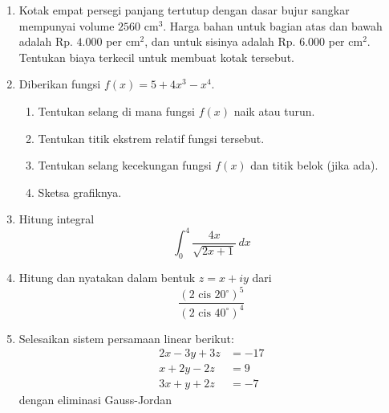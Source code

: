\documentclass[11pt,openany,a4paper]{article}
\begin{document}
    \begin{enumerate}
	\item Kotak empat persegi panjang tertutup dengan dasar bujur sangkar mempunyai volume \(2560 \text{ cm}^3\).  
  Harga bahan untuk bagian atas dan bawah adalah Rp. \(4.000\) per \(\text{cm}^2\), dan untuk sisinya adalah Rp. \(6.000\) per \(\text{cm}^2\).  
  Tentukan biaya terkecil untuk membuat kotak tersebut.  

        \item Diberikan fungsi \( f(x) = 5 + 4x^3 - x^4 \).  
        \begin{enumerate}
            \item Tentukan selang di mana fungsi \( f(x) \) naik atau turun.
            \item Tentukan titik ekstrem relatif fungsi tersebut.
            \item Tentukan selang kecekungan fungsi \( f(x) \) dan titik belok (jika ada).
            \item Sketsa grafiknya.
        \end{enumerate}

        \item Hitung integral  
        \[
        \int_{0}^{4} \frac{4x}{\sqrt{2x+1}} \, dx
        \]
        
        \item Hitung dan nyatakan dalam bentuk \( z = x + iy \) dari  
        \[
        \frac{(2 \text{ cis } 20^\circ)^5}{(2 \text{ cis } 40^\circ)^4}
        \]

        \item Selesaikan sistem persamaan linear berikut:  
        \[
        \begin{aligned}
            2x - 3y + 3z &= -17 \\
            x + 2y - 2z &= 9 \\
            3x + y + 2z &= -7
        \end{aligned}
        \]
        dengan eliminasi Gauss-Jordan
    \end{enumerate}
	

\end{document}
